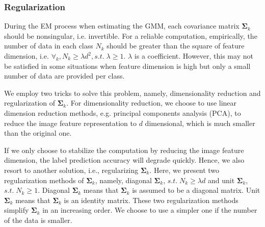 \documentclass{article}
\begin{document}


\subsubsection{Regularization}
\label{sec:analysisOptimization}
During the EM process when estimating the GMM, each covariance matrix $\bm{\Sigma}_k$ should be nonsingular, i.e. invertible. For a reliable computation, empirically, the number of data in each class $N_k$ should be greater than the square of feature dimension, i.e. $\forall_k, N_k \geq \lambda d^2, s.t. \; \lambda \geq 1 $. $\lambda$ is a coefficient. However, this may not be satisfied in some situations when feature dimension is high but only a small number of data are provided per class.

We employ two tricks to solve this problem, namely, dimensionality reduction and regularization of $\bm{\Sigma}_k$. For dimensionality reduction, we choose to use linear dimension reduction methods, e.g. principal components analysis (PCA), to reduce the image feature representation to $d$ dimensional, which is much smaller than the original one.

If we only choose to stabilize the computation by reducing the image feature dimension, the label prediction accuracy will degrade quickly. Hence,  we also resort to another solution, i.e., regularizing $\bm{\Sigma}_k$. Here, we present two regularization methods of $\bm{\Sigma}_k$, namely, diagonal $\bm{\Sigma}_k$, $s.t. \; N_k \geq \lambda d$ and unit $\bm{\Sigma}_k$, $s.t. \; N_k \geq 1$. Diagonal $\bm{\Sigma}_k$ means that $\bm{\Sigma}_k$ is assumed to be a diagonal matrix. Unit $\bm{\Sigma}_k$ means that $\bm{\Sigma}_k$ is an identity matrix. These two regularization methods simplify $\bm{\Sigma}_k$ in an increasing order. We choose to use a simpler one if the number of the data is smaller.

\end{document}
